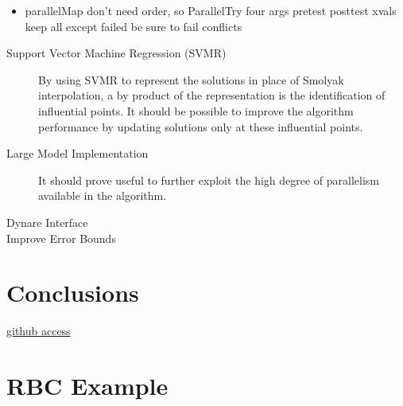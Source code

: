 \documentclass[12pt]{article}
\begin{document}
\begin{itemize}
\item parallelMap don't need order, so ParallelTry  four args pretest posttest xvals keep all except failed  be sure to fail conflicts
\end{itemize}

\begin{description}
\item[Support Vector Machine Regression (SVMR)] By using SVMR to represent the solutions in place of Smolyak interpolation, a by product of the representation is the identification of influential points.  It should be possible to improve the algorithm performance by updating solutions only at these influential points.
\item[Large Model Implementation] It should prove useful to further exploit 
the high degree of parallelism available in the algorithm.
\item[Dynare Interface] 
\item[Improve Error Bounds] 
\end{description}
\section{Conclusions}
\begin{description}
\item[\href{https://github.com/es335mathwiz/AMASeriesRepresentation.git}{github access}] 
\end{description}
\label{sec:conc}






\appendix


\section{RBC Example}
\label{sec:rbc-example-1}
\end{document}
